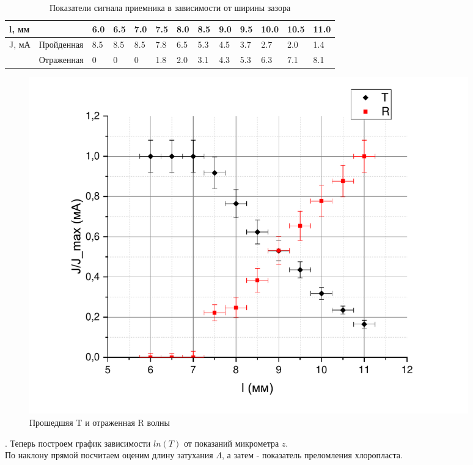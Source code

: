 \documentclass[12pt]{article}
\begin{document}
\begin{table}[!h]
\caption{Показатели сигнала приемника в зависимости от ширины зазора}
\begin{tabular}{|l|l|l|l|l|l|l|l|l|l|l|l|l|}
\hline
\multicolumn{2}{|l|}{l, мм}&  6.0 & 6.5 & 7.0 & 7.5 & 8.0 & 8.5 & 9.0 & 9.5 & 10.0 & 10.5 & 11.0 \\ \hline
\multirow{2}{*}{J, мА}& Пройденная& 8.5 & 8.5 & 8.5 & 7.8 & 6.5 & 5.3 & 4.5 & 3.7 & 2.7 & 2.0 & 1.4 \\ \cline{2-13} 
                      & Отраженная & 0 & 0 & 0 & 1.8 & 2.0 & 3.1 & 4.3 & 5.3 & 6.3 & 7.1 & 8.1  \\ \hline
\end{tabular}
\end{table}
\begin{figure}[!h]
\begin{center}
\includegraphics[width = 0.92\textwidth]{TplusR}
\caption{Прошедшяя T и отраженная R волны}
\end{center}
\end{figure}
. Теперь построем график зависимости $ln(T)$ от показаний микрометра $z$.\\ По наклону прямой посчитаем оценим длину затухания $\Lambda$, а затем - показатель преломления хлоропласта.\\
\end{document}
